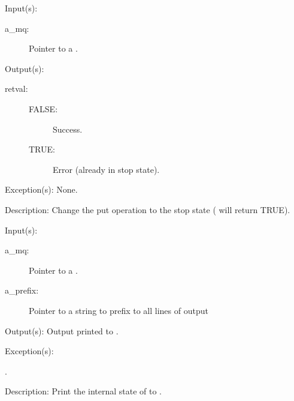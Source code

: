 \begin{capi}
\begin{capilist}
	\item[Input(s): ]
		\begin{description}\item[]
		\item[a\_mq: ]
			Pointer to a .
		\end{description}
	\item[Output(s): ]
		\begin{description}\item[]
		\item[retval: ]
			\begin{description}\item[]
			\item[FALSE: ] Success.
			\item[TRUE: ] Error (already in stop state).
			\end{description}
		\end{description}
	\item[Exception(s): ] None.
	\item[Description: ]
		Change the put operation to the stop state
		( will return TRUE).
	\end{capilist}
\label{mq_dump}
	\begin{capilist}
	\item[Input(s): ]
		\begin{description}\item[]
		\item[a\_mq: ]
			Pointer to a .
		\item[a\_prefix: ]
			Pointer to a string to prefix to all lines of output
		\end{description}
	\item[Output(s): ]
		Output printed to .
	\item[Exception(s): ]
		\begin{description}\item[]
		\item[.]
		\end{description}
	\item[Description: ]
		Print the internal state of  to .
	\end{capilist}
\end{capi}
